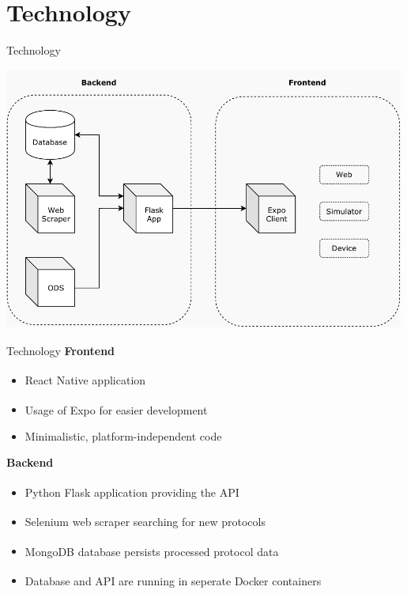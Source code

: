 \documentclass{beamer}
\newcounter{index}
\begin{document}
  \section{Technology}
  \begin{frame}[plain]{Technology}
    \begin{center}
      \includegraphics[width=0.99\textwidth]{fig/technology_overview.pdf}
    \end{center}
  \end{frame}

  \begin{frame}[plain]{Technology}
    \textbf{\faDesktop}\quad\textbf{Frontend}
    \begin{itemize}
      \item React Native\textsuperscript{\hyperlink{link-react-native}{}} application
      \item Usage of Expo\textsuperscript{\hyperlink{link-expo}{}} for easier development
      \item Minimalistic, platform-independent code
    \end{itemize}
    \textbf{\faServer}\quad\textbf{Backend}
    \begin{itemize}
      \item Python Flask\textsuperscript{\hyperlink{link-flask}{}} application providing the API
      \item Selenium\textsuperscript{\hyperlink{link-selenium}{}} web scraper searching for new protocols
      \item MongoDB\textsuperscript{\hyperlink{link-mongodb}{}} database persists processed protocol data
      \item Database and API are running in seperate Docker\textsuperscript{\hyperlink{link-docker}{}} containers
    \end{itemize}
  \end{frame}
\end{document}
